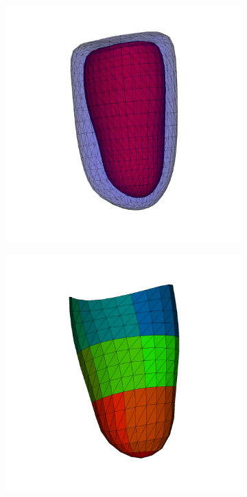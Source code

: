 \begin{figure}[htbp]
  \centering
  \begin{subfigure}[t]{0.3\textwidth}
    \includegraphics[width=\textwidth]{chapters/introduction/figures/geometry/raw.png}
    \caption{\label{fig:echopac_out_surf}}
  \end{subfigure}
  \begin{subfigure}[t]{0.3\textwidth}
    \includegraphics[width=\textwidth]{chapters/introduction/figures/geometry/strain_mesh.png}

\end{subfigure}
\end{figure}
